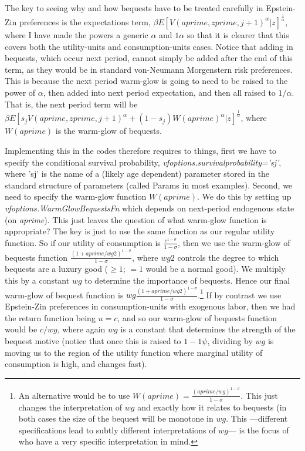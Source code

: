 The key to seeing why and how bequests have to be treated carefully in Epstein-Zin preferences is the expectations term, $\beta E[V(aprime,zprime,j+1)^{\alpha}|z]^{\frac{1}{\alpha}}$, where I have made the powers a generic $\alpha$ and $1\alpha$ so that it is clearer that this covers both the utility-units and consumption-units cases. Notice that adding in bequests, which occur next period, cannot simply be added after the end of this term, as they would be in standard von-Neumann Morgenstern risk preferences. This is because the next period warm-glow is going to need to be raised to the power of $\alpha$, then added into next period expectation, and then all raised to $1/\alpha$. That is, the next period term will be $\beta E[ s_j V(aprime,zprime,j+1)^{\alpha} + (1-s_j)W(aprime)^{\alpha}|z]^{\frac{1}{\alpha}}$, where $W(aprime)$ is the warm-glow of bequests.

Implementing this in the codes therefore requires to things, first we have to specify the conditional survival probability, \textit{vfoptions.survivalprobability='sj'}, where 'sj' is the name of a (likely age dependent) parameter stored in the standard structure of parameters (called Params in most examples). Second, we need to specify the warm-glow function $W(aprime)$. We do this by setting up \textit{vfoptions.WarmGlowBequestsFn} which depends on next-period endogenous state (on \textit{aprime}). This just leaves the question of what warm-glow function is appropriate? The key is just to use the same function as our regular utility function. So if our utility of consumption is $\frac{c^{1-\sigma}}{1-\sigma}$, then we use the warm-glow of bequests function $\frac{(1+aprime/wg2)^{1-\sigma}}{1-\sigma}$, where $wg2$ controls the degree to which bequests are a luxury good ($\geq 1$; $=1$ would be a normal good). We multiply this by a constant $wg$ to determine the importance of bequests. Hence our final warm-glow of bequest function is $wg\frac{(1+aprime/wg2)^{1-\sigma}}{1-\sigma}$.\footnote{An alternative would be to use $W(aprime)=\frac{(aprime/wg)^{1-\sigma}}{1-\sigma}$. This just changes the interpretation of $wg$ and exactly how it relates to bequests (in both cases the size of the bequest will be monotone in $wg$. This ---different specifications lead to subtly different interpretations of $wg$--- is the focus of \cite*{KraftMunkWeiss2022} who have a very specific interpretation in mind.} If by contrast we use Epstein-Zin preferences in consumption-units with exogenous labor, then we had the return function being $u=c$, and so our warm-glow of bequests function would be $c/wg$, where again $wg$ is a constant that determines the strength of the bequest motive (notice that once this is raised to $1-1\psi$, dividing by $wg$ is moving us to the region of the utility function where marginal utility of consumption is high, and changes fast).

